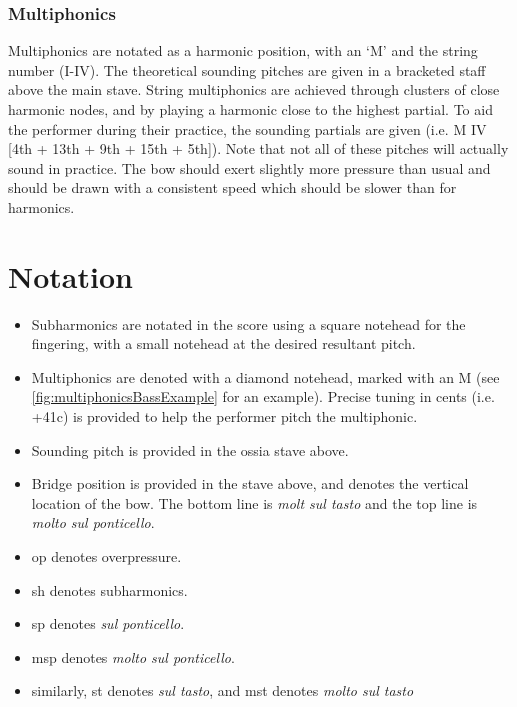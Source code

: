 \subsubsection*{Multiphonics}
Multiphonics are notated as a harmonic position, with an `M' and the string number (I-IV). 
The theoretical sounding pitches are given in a bracketed staff above the main stave.
String multiphonics are achieved through clusters of close harmonic nodes, and by playing a harmonic close to the highest partial.
To aid the performer during their practice, the sounding partials are given (i.e. M IV [4th + 13th + 9th + 15th + 5th]).
Note that not all of these pitches will actually sound in practice.
The bow should exert slightly more pressure than usual and should be drawn with a consistent speed which should be slower than for harmonics.

\section*{Notation}
\begin{itemize}

    \item Subharmonics are notated in the score using a square notehead for the fingering, with a small notehead at the desired resultant pitch.
    \item Multiphonics are denoted with a diamond notehead, marked with an M (see \autoref{fig:multiphonicsBassExample} for an example). Precise tuning in cents (i.e. +41c) is provided to help the performer pitch the multiphonic.
    \item Sounding pitch is provided in the ossia stave above.
    \item Bridge position is provided in the stave above, and denotes the vertical location of the bow. The bottom line is \emph{molt sul tasto} and the top line is \emph{molto sul ponticello}.
    \item op denotes overpressure.
    \item sh denotes subharmonics.
    \item sp denotes \emph{sul ponticello}.
    \item msp denotes \emph{molto sul ponticello}.
    \item similarly, st denotes \emph{sul tasto}, and mst denotes \emph{molto sul tasto}
\end{itemize}

\newpage\label{app:The Veldt Score}

% 

